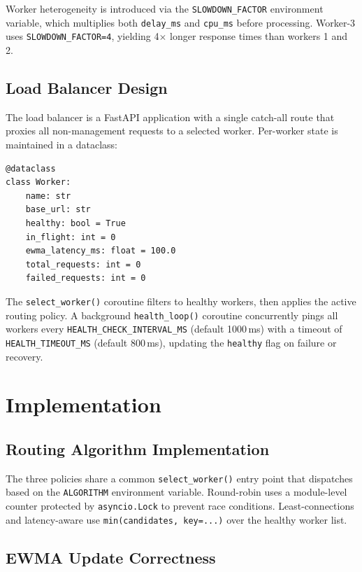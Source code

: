 \documentclass[conference]{IEEEtran}
\begin{document}
Worker heterogeneity is introduced via the \texttt{SLOWDOWN\_FACTOR}
environment variable, which multiplies both \texttt{delay\_ms} and
\texttt{cpu\_ms} before processing. Worker-3 uses
\texttt{SLOWDOWN\_FACTOR=4}, yielding 4$\times$ longer response times
than workers 1 and 2.

\subsection{Load Balancer Design}

The load balancer is a FastAPI application with a single catch-all
route that proxies all non-management requests to a selected worker.
Per-worker state is maintained in a dataclass:

\begin{lstlisting}
@dataclass
class Worker:
    name: str
    base_url: str
    healthy: bool = True
    in_flight: int = 0
    ewma_latency_ms: float = 100.0
    total_requests: int = 0
    failed_requests: int = 0
\end{lstlisting}

The \texttt{select\_worker()} coroutine filters to healthy workers,
then applies the active routing policy. A background
\texttt{health\_loop()} coroutine concurrently pings all workers every
\texttt{HEALTH\_CHECK\_INTERVAL\_MS} (default 1000\,ms) with a timeout
of \texttt{HEALTH\_TIMEOUT\_MS} (default 800\,ms), updating the
\texttt{healthy} flag on failure or recovery.

\section{Implementation}

\subsection{Routing Algorithm Implementation}

The three policies share a common \texttt{select\_worker()} entry point
that dispatches based on the \texttt{ALGORITHM} environment variable.
Round-robin uses a module-level counter protected by
\texttt{asyncio.Lock} to prevent race conditions. Least-connections and
latency-aware use \texttt{min(candidates, key=...)} over the healthy
worker list.

\subsection{EWMA Update Correctness}
\end{document}
